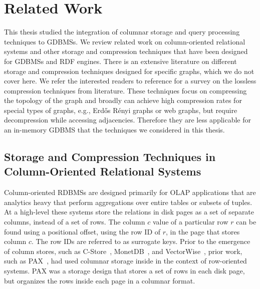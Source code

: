 \chapter{Related Work}
\label{c:related-works}

This thesis studied the integration of columnar storage and query processing techniques to GDBMSs. We review related work on column-oriented relational systems and other storage and compression techniques that have been designed for GDBMSs and RDF engines. There is an extensive literature on different storage and compression techniques designed for specific graphs, which we do not cover here. We refer the interested readers to reference \cite{sahu:survey, besta2018survey} for a survey on the lossless compression techniques from literature. These techniques focus on compressing the topology of the graph and broadly can achieve high compression rates for special types of graphs, e.g., Erd\H{o}s R\'enyi graphs or web graphs, but require decompression while accessing adjacencies. Therefore they are less applicable for an in-memory GDBMS that the techniques we considered in this thesis.


\section{Storage and Compression Techniques in Column-Oriented Relational Systems}
\label{sec:column-stores-overview}

Column-oriented RDBMSs are designed primarily for OLAP applications that are analytics heavy that perform aggregations over entire tables or subsets of tuples. At a high-level these systems store the relations in disk pages as a set of separate columns, instead of a set of rows. The column $c$ value of a particular row $r$ can be found using a positional offset, using the row ID of $r$, in the page that stores column $c$. The row IDs are referred to as surrogate keys. Prior to the emergence of column stores, such as C-Store~\cite{c-store}, MonetDB~\cite{monet-2decades}, and VectorWise~\cite{boncz-vectorwise, boncz-vectorwise1},  prior work, such as PAX~\cite{pax}, had used columnar storage inside in the context of row-oriented systems. PAX was a storage design that stores a set of rows in each disk page, but organizes the rows inside each page in a columnar format. 

